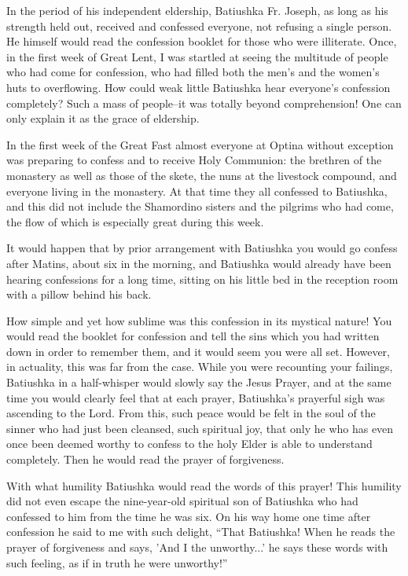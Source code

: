 In the period of his independent eldership, Batiushka Fr. Joseph, as long as his strength held out, received and confessed everyone, not refusing a single person. He himself would read the confession booklet for those who were illiterate. Once, in the first week of Great Lent, I was startled at seeing the multitude of people who had come for confession, who had filled both the men's and the women's huts to overflowing. How could weak little Batiushka hear everyone's confession completely? Such a mass of people--it was totally beyond comprehension! One can only explain it as the grace of eldership.

In the first week of the Great Fast almost everyone at Optina without exception was preparing to confess and to receive Holy Communion: the brethren of the monastery as well as those of the skete, the nuns at the livestock compound, and everyone living in the monastery. At that time they all confessed to Batiushka, and this did not include the Shamordino sisters and the pilgrims who had come, the flow of which is especially great during this week.

It would happen that by prior arrangement with Batiushka you would go confess after Matins, about six in the morning, and Batiushka would already have been hearing confessions for a long time, sitting on his little bed in the reception room with a pillow behind his back.

How simple and yet how sublime was this confession in its mystical nature! You would read the booklet for confession and tell the sins which you had written down in order to remember them, and it would seem you were all set. However, in actuality, this was far from the case. While you were recounting your failings, Batiushka in a half-whisper would slowly say the Jesus Prayer, and at the same time you would clearly feel that at each prayer, Batiushka's prayerful sigh was ascending to the Lord. From this, such peace would be felt in the soul of the sinner who had just been cleansed, such spiritual joy, that only he who has even once been deemed worthy to confess to the holy Elder is able to understand completely. Then he would read the prayer of forgiveness.

With what humility Batiushka would read the words of this prayer! This humility did not even escape the nine-year-old spiritual son of Batiushka who had confessed to him from the time he was six. On his way home one time after confession he said to me with such delight, ``That Batiushka! When he reads the prayer of forgiveness and says, 'And I the unworthy...' he says these words with such feeling, as if in truth he were unworthy!''

